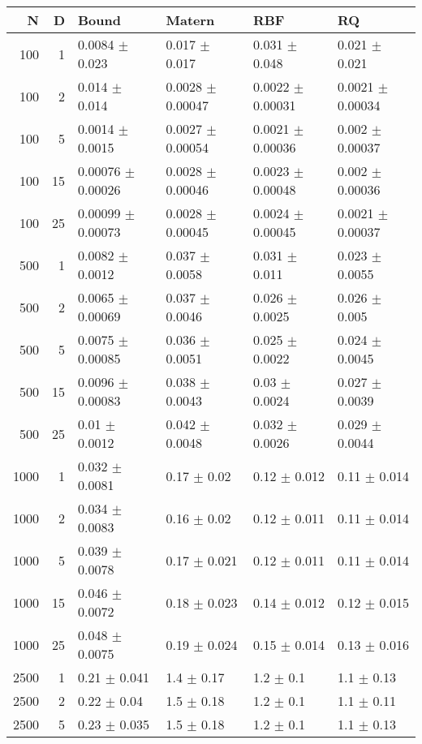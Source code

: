 \begin{tabular}{rrllll}
  \toprule
N & D & Bound & Matern & RBF & RQ \\ 
  \midrule
100 &  1 & 0.0084 $\pm$ 0.023 & 0.017 $\pm$ 0.017 & 0.031 $\pm$ 0.048 & 0.021 $\pm$ 0.021 \\ 
  100 &  2 & 0.014 $\pm$ 0.014 & 0.0028 $\pm$ 0.00047 & 0.0022 $\pm$ 0.00031 & 0.0021 $\pm$ 0.00034 \\ 
  100 &  5 & 0.0014 $\pm$ 0.0015 & 0.0027 $\pm$ 0.00054 & 0.0021 $\pm$ 0.00036 & 0.002 $\pm$ 0.00037 \\ 
  100 & 15 & 0.00076 $\pm$ 0.00026 & 0.0028 $\pm$ 0.00046 & 0.0023 $\pm$ 0.00048 & 0.002 $\pm$ 0.00036 \\ 
  100 & 25 & 0.00099 $\pm$ 0.00073 & 0.0028 $\pm$ 0.00045 & 0.0024 $\pm$ 0.00045 & 0.0021 $\pm$ 0.00037 \\ 
  500 &  1 & 0.0082 $\pm$ 0.0012 & 0.037 $\pm$ 0.0058 & 0.031 $\pm$ 0.011 & 0.023 $\pm$ 0.0055 \\ 
  500 &  2 & 0.0065 $\pm$ 0.00069 & 0.037 $\pm$ 0.0046 & 0.026 $\pm$ 0.0025 & 0.026 $\pm$ 0.005 \\ 
  500 &  5 & 0.0075 $\pm$ 0.00085 & 0.036 $\pm$ 0.0051 & 0.025 $\pm$ 0.0022 & 0.024 $\pm$ 0.0045 \\ 
  500 & 15 & 0.0096 $\pm$ 0.00083 & 0.038 $\pm$ 0.0043 & 0.03 $\pm$ 0.0024 & 0.027 $\pm$ 0.0039 \\ 
  500 & 25 & 0.01 $\pm$ 0.0012 & 0.042 $\pm$ 0.0048 & 0.032 $\pm$ 0.0026 & 0.029 $\pm$ 0.0044 \\ 
  1000 &  1 & 0.032 $\pm$ 0.0081 & 0.17 $\pm$ 0.02 & 0.12 $\pm$ 0.012 & 0.11 $\pm$ 0.014 \\ 
  1000 &  2 & 0.034 $\pm$ 0.0083 & 0.16 $\pm$ 0.02 & 0.12 $\pm$ 0.011 & 0.11 $\pm$ 0.014 \\ 
  1000 &  5 & 0.039 $\pm$ 0.0078 & 0.17 $\pm$ 0.021 & 0.12 $\pm$ 0.011 & 0.11 $\pm$ 0.014 \\ 
  1000 & 15 & 0.046 $\pm$ 0.0072 & 0.18 $\pm$ 0.023 & 0.14 $\pm$ 0.012 & 0.12 $\pm$ 0.015 \\ 
  1000 & 25 & 0.048 $\pm$ 0.0075 & 0.19 $\pm$ 0.024 & 0.15 $\pm$ 0.014 & 0.13 $\pm$ 0.016 \\ 
  2500 &  1 & 0.21 $\pm$ 0.041 & 1.4 $\pm$ 0.17 & 1.2 $\pm$ 0.1 & 1.1 $\pm$ 0.13 \\ 
  2500 &  2 & 0.22 $\pm$ 0.04 & 1.5 $\pm$ 0.18 & 1.2 $\pm$ 0.1 & 1.1 $\pm$ 0.11 \\ 
  2500 &  5 & 0.23 $\pm$ 0.035 & 1.5 $\pm$ 0.18 & 1.2 $\pm$ 0.1 & 1.1 $\pm$ 0.13 \\ 

\end{tabular}
